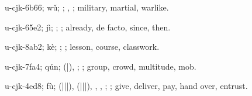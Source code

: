 \begin{multicols}{2}
{\cjkgGlue{}u-cjk-6b66; wǔ; \cjkgGlue{}\cjkgGlue{}\cjkgGlue{}; \cjkgGlue{}, \cjkgGlue{}; military, martial, warlike.

\cjkgGlue{}u-cjk-65e2; jì; \cjkgGlue{}\cjkgGlue{}\cjkgGlue{}; \cjkgGlue{}; already, de facto, since, then.

\cjkgGlue{}u-cjk-8ab2; kè; \cjkgGlue{}; \cjkgGlue{}; lesson, course, classwork.

\cjkgGlue{}u-cjk-7fa4; qún; \cjkgGlue{}\cjkgGlue{}(\cjkgGlue{}|\cjkgGlue{}), \cjkgGlue{}\cjkgGlue{}\cjkgGlue{}; \cjkgGlue{}; group, crowd, multitude, mob.

\cjkgGlue{}u-cjk-4ed8; fù; \cjkgGlue{}\cjkgGlue{}(\cjkgGlue{}|\cjkgGlue{}|\cjkgGlue{}|\cjkgGlue{}), \cjkgGlue{}\cjkgGlue{}(\cjkgGlue{}|\cjkgGlue{}|\cjkgGlue{}|\cjkgGlue{}), \cjkgGlue{}, \cjkgGlue{}, \cjkgGlue{}; \cjkgGlue{}; give, deliver, pay, hand over, entrust.

}
\end{multicols}
